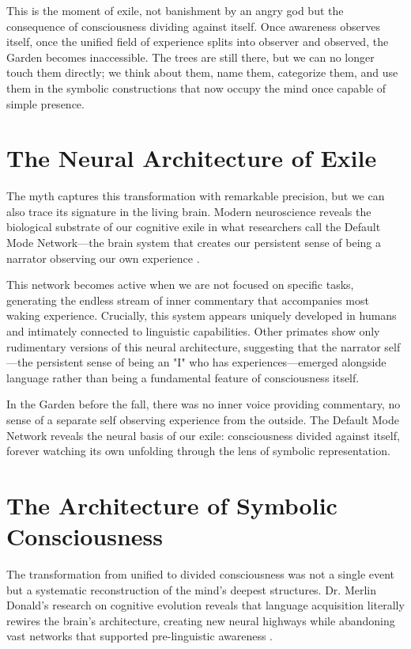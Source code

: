 This is the moment of exile, not banishment by an angry god but the consequence of consciousness dividing against itself. Once awareness observes itself, once the unified field of experience splits into observer and observed, the Garden becomes inaccessible. The trees are still there, but we can no longer touch them directly; we think about them, name them, categorize them, and use them in the symbolic constructions that now occupy the mind once capable of simple presence.

\section{The Neural Architecture of Exile}

The myth captures this transformation with remarkable precision, but we can also trace its signature in the living brain. Modern neuroscience reveals the biological substrate of our cognitive exile in what researchers call the Default Mode Network—the brain system that creates our persistent sense of being a narrator observing our own experience \parencite{raichle2001default,buckner2008brain}.

This network becomes active when we are not focused on specific tasks, generating the endless stream of inner commentary that accompanies most waking experience. Crucially, this system appears uniquely developed in humans and intimately connected to linguistic capabilities. Other primates show only rudimentary versions of this neural architecture, suggesting that the narrator self—the persistent sense of being an "I" who has experiences—emerged alongside language rather than being a fundamental feature of consciousness itself.

In the Garden before the fall, there was no inner voice providing commentary, no sense of a separate self observing experience from the outside. The Default Mode Network reveals the neural basis of our exile: consciousness divided against itself, forever watching its own unfolding through the lens of symbolic representation.

\section{The Architecture of Symbolic Consciousness}

The transformation from unified to divided consciousness was not a single event but a systematic reconstruction of the mind's deepest structures. Dr. Merlin Donald's research on cognitive evolution reveals that language acquisition literally rewires the brain's architecture, creating new neural highways while abandoning vast networks that supported pre-linguistic awareness \parencite{donald1991origins}.

